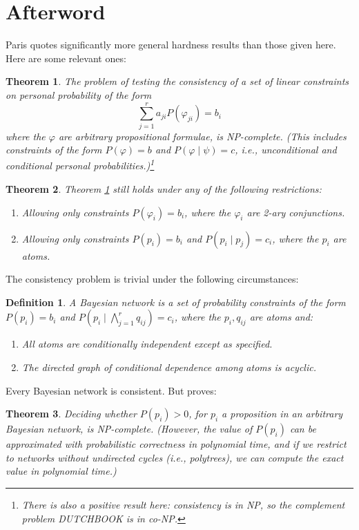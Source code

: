\documentclass[letterpaper,12pt]{article}
\renewcommand{\phi}{\varphi}
\newtheorem{definition}{Definition}
\newtheorem{theorem}{Theorem}
\begin{document}
\section{Afterword}
Paris quotes significantly more general hardness results than those given here. Here are some relevant ones:
\begin{theorem}
\label{linearConstraintsNPComplete}
The problem of testing the consistency of a set of linear constraints on personal probability of the form
$$\sum_{j=1}^r a_{ji} P(\phi_{ji}) = b_i$$
where the $\phi$ are arbitrary propositional formulae, is NP-complete. (This includes constraints of the form $P(\phi) = b$ and $P(\phi \mid \psi) = c$, i.e., unconditional and conditional personal probabilities.)\footnote{There is also a positive result here: consistency is in NP, so the complement problem DUTCHBOOK is in co-NP.}
\end{theorem}
\begin{theorem}
\label{simpleConstraintsNPHard}
Theorem \ref{linearConstraintsNPComplete} still holds under any of the following restrictions:
\begin{enumerate}
\item
Allowing only constraints $P(\phi_i) = b_i$, where the $\phi_i$ are 2-ary conjunctions.
\item
Allowing only constraints $P(p_i) = b_i$ and $P(p_i \mid p_j) = c_i$, where the $p_i$ are atoms.
\end{enumerate}
\end{theorem}
The consistency problem is trivial under the following circumstances:
\begin{definition}
A \emph{Bayesian network} is a set of probability constraints of the form $P(p_i) = b_i$ and $P(p_i \mid \bigwedge_{j=1}^r q_{ij}) = c_i$, where the $p_i, q_{ij}$ are atoms and:
\begin{enumerate}
\item
All atoms are conditionally independent except as specified.
\item
The directed graph of conditional dependence among atoms is acyclic.
\end{enumerate}
\end{definition}
Every Bayesian network is consistent. But \cite{Cooper:1990:CCP:77754.77762} proves:

\begin{theorem}
\label{bayesNetNPHard}
Deciding whether $P(p_i) > 0$, for $p_i$ a proposition in an arbitrary Bayesian network, is NP-complete. (However, the value of $P(p_i)$ can be approximated with probabilistic correctness in polynomial time, and if we restrict to networks without \emph{undirected} cycles (i.e., polytrees), we can compute the exact value in polynomial time.)
\end{theorem}
\end{document}
